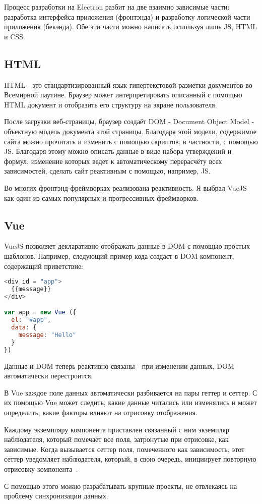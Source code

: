 Процесс разработки на Electron разбит на две взаимно зависимые части: разработка интерфейса приложения (фронтэнда) и разработку логической части приложения (бекэнда). Обе эти части можно написать используя лишь JS, HTML и CSS.

\subsection{HTML}

HTML - это стандартизированный язык гипертекстовой разметки документов во Всемирной паутине. Браузер может интерпретировать описанный с помощью HTML документ и отобразить его структуру на экране пользователя.

После загрузки веб-страницы, браузер создаёт DOM - Document Object Model - объектную модель документа этой страницы. Благодаря этой модели, содержимое сайта можно прочитать и изменить с помощью скриптов, в частности, с помощью JS.
Благодаря этому можно описать данные в виде набора утверждений и формул, изменение которых ведет к автоматическому перерасчёту всех зависимостей, сделать сайт реактивным с помощью, например, JS.

Во многих фронтэнд-фреймворках реализована реактивность. Я выбрал VueJS как один из самых популярных и прогрессивных фреймворков.

\subsection{Vue}

VueJS  позволяет декларативно отображать данные в DOM с помощью простых шаблонов. Например, следующий пример кода создаст в DOM компонент, содержащий приветствие:

\begin{lstlisting}[language=JavaScript]
<div id = "app">
  {{message}}
</div>

var app = new Vue ({
  el: "#app",
  data: {
    message: "Hello"
  }
})
\end{lstlisting}

Данные и DOM теперь реактивно связаны - при изменении данных, DOM автоматически перестроится.

В Vue каждое поле данных автоматически разбивается на пары геттер и сеттер. С их помощью Vue может следить, какие данные читались или изменялись и может определить, какие факторы влияют на отрисовку отображения.

Каждому экземпляру компонента приставлен связанный с ним экземпляр наблюдателя, который помечает все поля, затронутые при отрисовке, как зависимые. Когда вызывается сеттер поля, помеченного как зависимость, этот сеттер уведомляет наблюдателя, который, в свою очередь, инициирует повторную отрисовку компонента~\cite{vue}.

С помощью этого можно разрабатывать крупные проекты, не отвлекаясь на проблему синхронизации данных.


